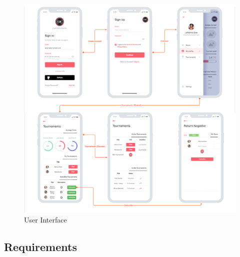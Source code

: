\documentclass{article}
\begin{document}
\begin{figure}
    \hspace*{-2cm}
    \includegraphics[scale=1.5]{UI.png}
    \caption{User Interface}
\end{figure}
\newpage
\subsection{Requirements}
\end{document}
